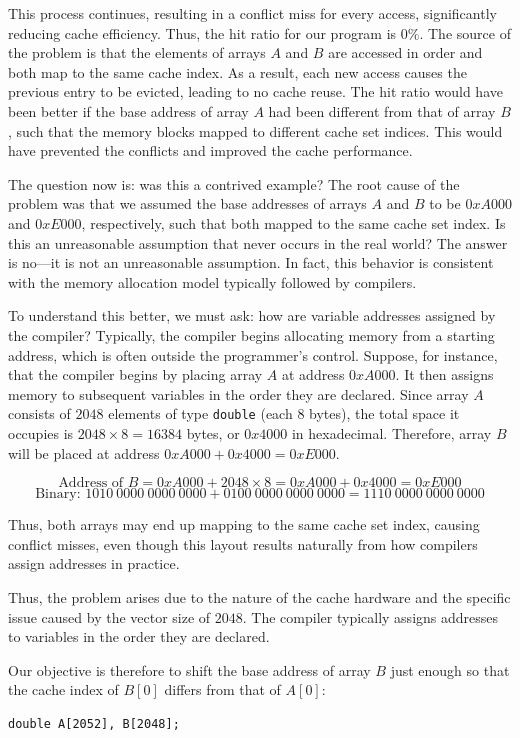 \documentclass[12pt]{book}
\begin{document}
This process continues, resulting in a conflict miss for every access, significantly reducing cache efficiency. Thus, the hit ratio for our program is $0\%$. The source of the problem is that the elements of arrays $A$ and $B$ are accessed in order and both map to the same cache index. As a result, each new access causes the previous entry to be evicted, leading to no cache reuse. The hit ratio would have been better if the base address of array $A$ had been different from that of array $B$, such that the memory blocks mapped to different cache set indices. This would have prevented the conflicts and improved the cache performance.

The question now is: was this a contrived example? The root cause of the problem was that we assumed the base addresses of arrays $A$ and $B$ to be $0xA000$ and $0xE000$, respectively, such that both mapped to the same cache set index. Is this an unreasonable assumption that never occurs in the real world? The answer is no—it is not an unreasonable assumption. In fact, this behavior is consistent with the memory allocation model typically followed by compilers.

To understand this better, we must ask: how are variable addresses assigned by the compiler? Typically, the compiler begins allocating memory from a starting address, which is often outside the programmer’s control. Suppose, for instance, that the compiler begins by placing array $A$ at address $0xA000$. It then assigns memory to subsequent variables in the order they are declared. Since array $A$ consists of $2048$ elements of type \texttt{double} (each 8 bytes), the total space it occupies is $2048 \times 8 = 16384$ bytes, or $0x4000$ in hexadecimal. Therefore, array $B$ will be placed at address $0xA000 + 0x4000 = 0xE000$.

\[
\text{Address of } B = 0xA000 + 2048 \times 8 = 0xA000 + 0x4000 = 0xE000
\]
\[
\text{Binary: } 1010\ 0000\ 0000\ 0000 + 0100\ 0000\ 0000\ 0000 = 1110\ 0000\ 0000\ 0000
\]

Thus, both arrays may end up mapping to the same cache set index, causing conflict misses, even though this layout results naturally from how compilers assign addresses in practice.

Thus, the problem arises due to the nature of the cache hardware and the specific issue caused by the vector size of $2048$. The compiler typically assigns addresses to variables in the order they are declared.

Our objective is therefore to shift the base address of array $B$ just enough so that the cache index of $B[0]$ differs from that of $A[0]$:
\begin{lstlisting}[style=cppstyle]
double A[2052], B[2048];
\end{lstlisting}
\end{document}
